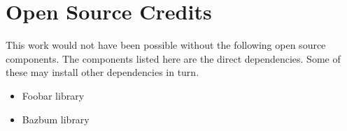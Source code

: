 \chapter{Open Source Credits}
%
\label{appendix:credits}

This work would not have been possible without the following open source components.
The components listed here are the direct dependencies.
Some of these may install other dependencies in turn.

\begin{itemize}
\item Foobar library~\cite{knuth:tb}
\item Bazbum library
\end{itemize}
